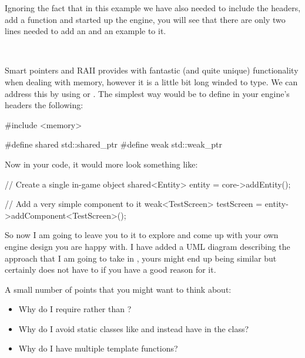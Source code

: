 \documentclass[10pt]{article}
\begin{document}
Ignoring the fact that in this example we have also needed to include
the headers, add a  function and started up the engine, you
will see that there are only two lines needed to add an 
and an example  to it.

\

Smart pointers and RAII provides  with fantastic (and quite unique) functionality when dealing with memory, however it is a little bit long winded to type.
We can address this by using  or . The simplest way would be to define in your engine's headers the following:

\begin{Code}
#include <memory>

#define shared std::shared_ptr
#define weak std::weak_ptr
\end{Code}

Now in your code, it would more look something like:

\begin{Code}
// Create a single in-game object
shared<Entity> entity = core->addEntity();

// Add a very simple component to it
weak<TestScreen> testScreen = entity->addComponent<TestScreen>();
\end{Code}


So now I am going to leave you to it to explore and come up with your own
engine design you are happy with.  I have added a UML diagram describing
the approach that I am going to take in , yours might end up
being similar but certainly does not have to if you have a good reason
for it.


A small number of points that you might want to think about:

\begin{itemize}

\item Why do I require  rather than ?
\item Why do I avoid static classes like  and instead have  in the  class?
\item Why do I have multiple  template functions?

\end{itemize}
\end{document}
